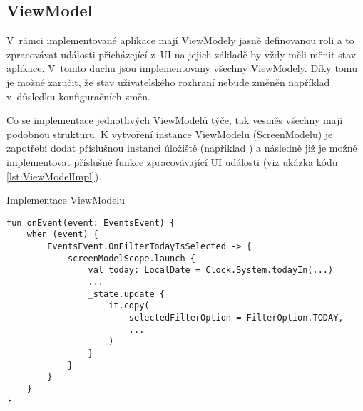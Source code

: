 \subsection{ViewModel} \label{ViewModelImpl}

V~rámci implementované aplikace mají ViewModely jasně definovanou roli a to zpracovávat události přicházející z~UI na jejich základě 
by vždy měli měnit stav aplikace. \cite{viewmodelEvents} V~tomto duchu jsou implementovany všechny ViewModely. Díky tomu je možné 
zaručit, že stav uživatelského rozhraní nebude změněn například v~důsledku konfiguračních změn. 

Co se implementace jednotlivých ViewModelů týče, tak vesměs všechny mají podobnou strukturu. K vytvoření instance ViewModelu (ScreenModelu)
je zapotřebí dodat příslušnou instanci úložiště (například ) a následně již je možné implementovat příslušné funkce
zpracovávající UI události (viz ukázka kódu \ref{lst:ViewModelImpl}). 


\begin{listing}[H]
\caption{Implementace ViewModelu}\label{lst:ViewModelImpl}
\begin{verbatim}
fun onEvent(event: EventsEvent) {
    when (event) {
        EventsEvent.OnFilterTodayIsSelected -> {
            screenModelScope.launch {
                val today: LocalDate = Clock.System.todayIn(...)
                ...
                _state.update {
                    it.copy(
                        selectedFilterOption = FilterOption.TODAY,
                        ...
                    )
                }
            }
        }
    }
}
\end{verbatim}
\end{listing}




